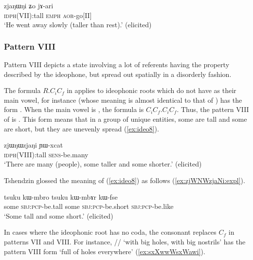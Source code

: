   \begin{exe} 
\ex  \label{ex:ideo7}
\gll  zjaŋɯŋi ʑo jɤ-ari   \\
\textsc{idph}(VII):tall  \textsc{emph} \textsc{aor}-go[II] \\
\glt `He went away slowly (taller than rest).'  (elicited)
 \end{exe}
 
  \subsubsection{Pattern VIII} \label{sec:ideo.VIII}
 Pattern VIII  depicts a state involving a lot of referents having the property described by the ideophone, but spread out spatially in a disorderly fashion. 

The formula $R$.$C_i$$C_f$ in  applies to ideophonic roots  which do  not have  as their main vowel, for instance  (whose meaning is almost identical to that of ) has the form . When the main vowel is , the formula is $C_i$$C_f$.$C_i$$C_f$. Thus, the pattern VIII of   is . This form means that in a group of unique entities, some are tall and some are short, but  they are unevenly spread (\ref{ex:ideo8}).
	
\begin{exe} 
\ex  \label{ex:ideo8}
\gll  zjɯŋɯzjaŋi ɲɯ-xcat \\
\textsc{idph}(VIII):tall \textsc{sens}-be.many \\
\glt `There are many (people), some taller and some shorter.'   (elicited)
  \end{exe}
	 
 Tshendzin glossed the meaning of (\ref{ex:ideo8}) as follows (\ref{ex:zjWNWzjaNi:expl}).
 
 \begin{exe} 
\ex  \label{ex:zjWNWzjaNi:expl}
\gll  tsuku kɯ-mbro tsuku kɯ-mbɤr kɯ-fse   \\
 some \textsc{sbj}:\textsc{pcp}-be.tall some \textsc{sbj}:\textsc{pcp}-be.short \textsc{sbj}:\textsc{pcp}-be.like \\
 \glt `Some tall and some short.'    (elicited)
  \end{exe}  

  In cases where the ideophonic root has no coda, the consonant  replaces $C_f$ in patterns VII and VIII. For instance, // `with big holes, with big nostrils' has the pattern VIII form  `full of holes everywhere' (\ref{ex:sxXwwWsxWawi}).


